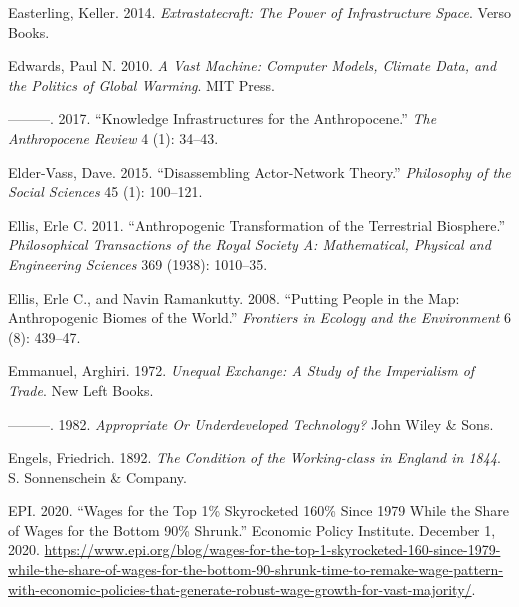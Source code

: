 \documentclass[a4paper, nobind]{templates/ociamthesis}
\newlength{\cslhangindent}
\newenvironment{CSLReferences}[2] %
 {%
  \setlength{\parindent}{0pt}
  \ifodd #1
  \let\oldpar\par
  \def\par{\hangindent=\cslhangindent\oldpar}
  \fi
  \setlength{\parskip}{1mm}
  \setlength{\baselineskip}{6mm}
 }%
 {}
\begin{document}
\begin{CSLReferences}{1}{0}
\leavevmode{}%
Easterling, Keller. 2014. \emph{Extrastatecraft: {The Power} of {Infrastructure Space}}. {Verso Books}.

\leavevmode{}%
Edwards, Paul N. 2010. \emph{A {Vast Machine}: {Computer Models}, {Climate Data}, and the {Politics} of {Global Warming}}. {MIT Press}.

\leavevmode{}%
---------. 2017. {``Knowledge Infrastructures for the {Anthropocene}.''} \emph{The Anthropocene Review} 4 (1): 34--43.

\leavevmode{}%
Elder-Vass, Dave. 2015. {``Disassembling Actor-Network Theory.''} \emph{Philosophy of the Social Sciences} 45 (1): 100--121.

\leavevmode{}%
Ellis, Erle C. 2011. {``Anthropogenic Transformation of the Terrestrial Biosphere.''} \emph{Philosophical Transactions of the Royal Society A: Mathematical, Physical and Engineering Sciences} 369 (1938): 1010--35.

\leavevmode{}%
Ellis, Erle C., and Navin Ramankutty. 2008. {``Putting People in the Map: Anthropogenic Biomes of the World.''} \emph{Frontiers in Ecology and the Environment} 6 (8): 439--47.

\leavevmode{}%
Emmanuel, Arghiri. 1972. \emph{Unequal {Exchange}: {A Study} of the {Imperialism} of {Trade}}. {New Left Books}.

\leavevmode{}%
---------. 1982. \emph{Appropriate {Or Underdeveloped Technology}?} {John Wiley \& Sons}.

\leavevmode{}%
Engels, Friedrich. 1892. \emph{The {Condition} of the {Working-class} in {England} in 1844}. {S. Sonnenschein \& Company}.

\leavevmode{}%
EPI. 2020. {``Wages for the Top 1\% Skyrocketed 160\% Since 1979 While the Share of Wages for the Bottom 90\% Shrunk.''} {Economic Policy Institute}. December 1, 2020. \url{https://www.epi.org/blog/wages-for-the-top-1-skyrocketed-160-since-1979-while-the-share-of-wages-for-the-bottom-90-shrunk-time-to-remake-wage-pattern-with-economic-policies-that-generate-robust-wage-growth-for-vast-majority/}.


\end{CSLReferences}
\end{document}
